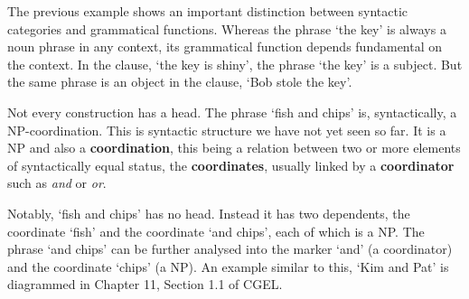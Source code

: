 \documentclass{scrarticle}
\begin{document}
The previous example shows an important distinction between syntactic categories and grammatical
functions. Whereas the phrase `the key' is always a noun phrase in any context, its grammatical
function depends fundamental on the context. In the clause, `the key is shiny', the phrase `the key'
is a subject. But the same phrase is an object in the clause, `Bob stole the key'.

Not every construction has a head. The phrase `fish and chips' is, syntactically, a NP-coordination.
This is syntactic structure we have not yet seen so far. It is a NP and  also a
\textbf{coordination}, this being a relation between two or more elements of syntactically equal
status, the \textbf{coordinates}, usually linked by a \textbf{coordinator} such as \emph{and} or
\emph{or}.

Notably, `fish and chips' has no head. Instead it has two dependents, the coordinate `fish' and the
coordinate `and chips', each of which is a NP. The phrase `and chips' can be further analysed into
the marker `and' (a coordinator) and the coordinate `chips' (a NP). An example similar to this, `Kim
and Pat' is diagrammed in Chapter 11, Section 1.1 of CGEL.
\end{document}
